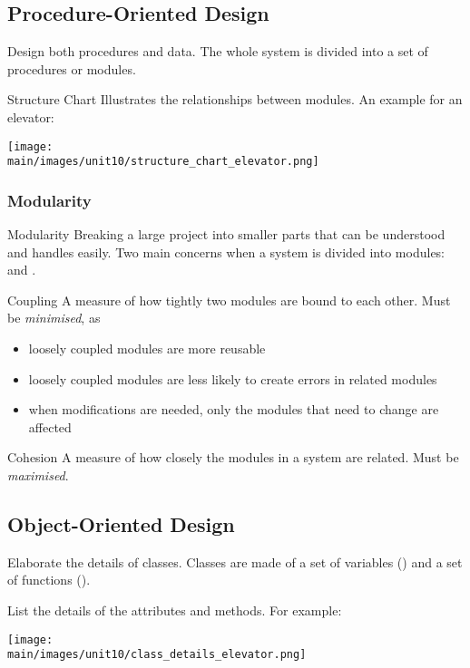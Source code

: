 \documentclass[\main/notes.tex]{subfiles}
\begin{document}
			\subsection{Procedure-Oriented Design}
				Design both procedures and data. The whole system is divided into a set of procedures or modules.
				\begin{definition}{Structure Chart}
					Illustrates the relationships between modules. An example for an elevator:
					\begin{center}
						\texttt{[image: \\main/images/unit10/structure\_chart\_elevator.png]}
					\end{center}
				\end{definition}
				\subsubsection{Modularity}
					\begin{definition}{Modularity}
						Breaking a large project into smaller parts that can be understood and handles easily. Two main concerns when a system is divided into modules:  and .
					\end{definition}
					\begin{definition}{Coupling}
						A measure of how tightly two modules are bound to each other. Must be \emph{minimised}, as
						\begin{itemize}[nosep]
							\item loosely coupled modules are more reusable
							\item loosely coupled modules are less likely to create errors in related modules
							\item when modifications are needed, only the modules that need to change are affected
						\end{itemize}
					\end{definition}
					\begin{definition}{Cohesion}
						A measure of how closely the modules in a system are related. Must be \emph{maximised}.
					\end{definition}
			\subsection{Object-Oriented Design}
				Elaborate the details of classes. Classes are made of a set of variables () and a set of functions ().

				List the details of the attributes and methods. For example:
				\begin{center}
					\texttt{[image: \\main/images/unit10/class\_details\_elevator.png]}
				\end{center}
\end{document}
